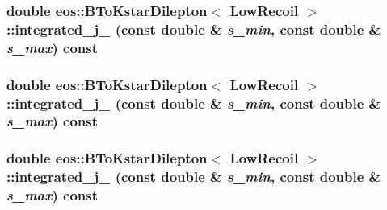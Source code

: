 \label{classeos_1_1BToKstarDilepton_3_01LowRecoil_01_4_a1c86b7c7225aea0d22cebf316234b031}
\hypertarget{classeos_1_1BToKstarDilepton_3_01LowRecoil_01_4_a9864625ce8aa2f4d1170ac1e1d4ed7f0}{
\subsubsection[{integrated\_\-j\_\-7}]{\setlength{\rightskip}{0pt plus 5cm}double eos::BToKstarDilepton$<$ {\bf LowRecoil} $>$::integrated\_\-j\_ (const double \& {\em s\_\-min}, \/  const double \& {\em s\_\-max}) const}}
\label{classeos_1_1BToKstarDilepton_3_01LowRecoil_01_4_a9864625ce8aa2f4d1170ac1e1d4ed7f0}
\hypertarget{classeos_1_1BToKstarDilepton_3_01LowRecoil_01_4_ae67222779f7f86cd7b7c6f68544dfb73}{
\subsubsection[{integrated\_\-j\_\-8}]{\setlength{\rightskip}{0pt plus 5cm}double eos::BToKstarDilepton$<$ {\bf LowRecoil} $>$::integrated\_\-j\_ (const double \& {\em s\_\-min}, \/  const double \& {\em s\_\-max}) const}}
\label{classeos_1_1BToKstarDilepton_3_01LowRecoil_01_4_ae67222779f7f86cd7b7c6f68544dfb73}
\hypertarget{classeos_1_1BToKstarDilepton_3_01LowRecoil_01_4_a7f2ec4b984a86fe7debe06dcbda8dfc1}{
\subsubsection[{integrated\_\-j\_\-9}]{\setlength{\rightskip}{0pt plus 5cm}double eos::BToKstarDilepton$<$ {\bf LowRecoil} $>$::integrated\_\-j\_ (const double \& {\em s\_\-min}, \/  const double \& {\em s\_\-max}) const}}
\label{classeos_1_1BToKstarDilepton_3_01LowRecoil_01_4_a7f2ec4b984a86fe7debe06dcbda8dfc1}
